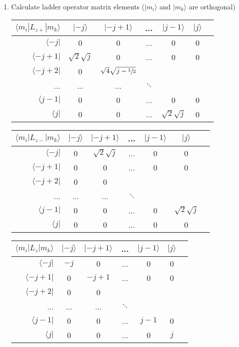 \documentclass[../main.tex]{subfiles}
\begin{document}
\begin{enumerate}
\item Calculate ladder operator matrix elements ($|m_i\rangle$ and $|m_k\rangle$ are orthogonal)
\begin{center}
\begin{tabular}{ r | c c c c c c}
$\langle m_i|L_{z+}|m_k\rangle$ & $|-j\rangle$ & $|-j+1\rangle$    & ... & $|j-1\rangle$ & $|j\rangle$ \\ \hline
$\langle-j|$   & 0 & 0 & ... & 0 & 0 \\
$\langle-j+1|$ & $\sqrt{2}\sqrt{j}$ & 0 &... & 0 & 0\\
$\langle-j+2|$ & 0 & $\sqrt{4}\sqrt{j-\sfrac{1}{2}}$ &\\
... & ... & ...& $\ddots$\\
$\langle j-1|$  & 0 & 0 & ... & 0 & 0\\
$\langle j|$    & 0 & 0 & ... & $\sqrt{2}\sqrt{j}$ & 0
\end{tabular}
\end{center}

\begin{center}
\begin{tabular}{ r | c c c c c c}
$\langle m_i|L_{z-}|m_k\rangle$ & $|-j\rangle$ & $|-j+1\rangle$    & ... & $|j-1\rangle$ & $|j\rangle$ \\ \hline
$\langle-j|$   & 0 & $\sqrt{2}\sqrt{j}$ & ... & 0 & 0 \\
$\langle-j+1|$ & 0 & 0 &... & 0 & 0\\
$\langle-j+2|$ & 0 & 0 &\\
... & ... & ...& $\ddots$\\
$\langle j-1|$  & 0 & 0 & ... & 0 & $\sqrt{2}\sqrt{j}$\\
$\langle j|$    & 0 & 0 & ... & 0 & 0
\end{tabular}
\end{center}

\begin{center}
\begin{tabular}{ r | c c c c c c}
$\langle m_i|L_{z}|m_k\rangle$ & $|-j\rangle$ & $|-j+1\rangle$    & ... & $|j-1\rangle$ & $|j\rangle$ \\ \hline
$\langle-j|$    & $-j$ & 0 & ... & 0 & 0 \\
$\langle-j+1|$  & 0 & $-j+1$ &... & 0 & 0\\
$\langle-j+2|$  & 0 & 0 &\\
... & ... & ... & $\ddots$\\
$\langle j-1|$  & 0 & 0 & ... & $j-1$ & 0\\
$\langle j|$    & 0 & 0 & ... & 0 & $j$
\end{tabular}
\end{center}


\end{enumerate}
\end{document}
